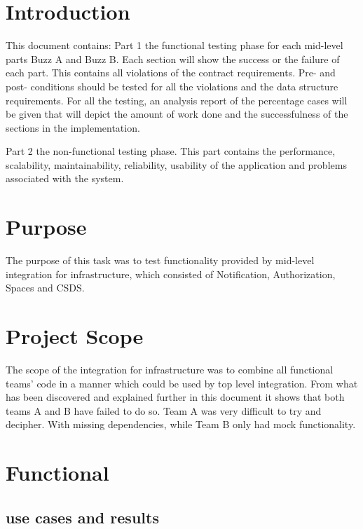 \documentclass[12pt]{article}
\begin{document}
\newpage
\tableofcontents
\newpage

\section{Introduction} %
This document contains:
Part 1 the functional testing phase for each mid-level parts Buzz A and Buzz B.
Each section will show the success or the failure of each part. This contains all violations of the contract requirements.
Pre- and post- conditions should be tested for all the violations and the data structure requirements.
For all the testing, an analysis report of the percentage cases will be given that will depict the amount of work done and the successfulness of the sections in the implementation.

Part 2 the non-functional testing phase.
This part contains the performance, scalability, maintainability, reliability, usability of the application and problems associated with the system.

\section{Purpose} %
The purpose of this task was to test functionality provided by mid-level integration for infrastructure, which consisted of Notification, Authorization, Spaces and CSDS.


\section{Project Scope} %
The scope of the integration for infrastructure was to combine all functional teams' code in a manner which could be used by top level integration. From what has been discovered and explained further in this document it shows that both teams A and B have failed to do so. Team A was very difficult to try and decipher. With missing dependencies, while Team B only had mock functionality.

\section{Functional} %
\subsection{use cases and results}
\end{document}
